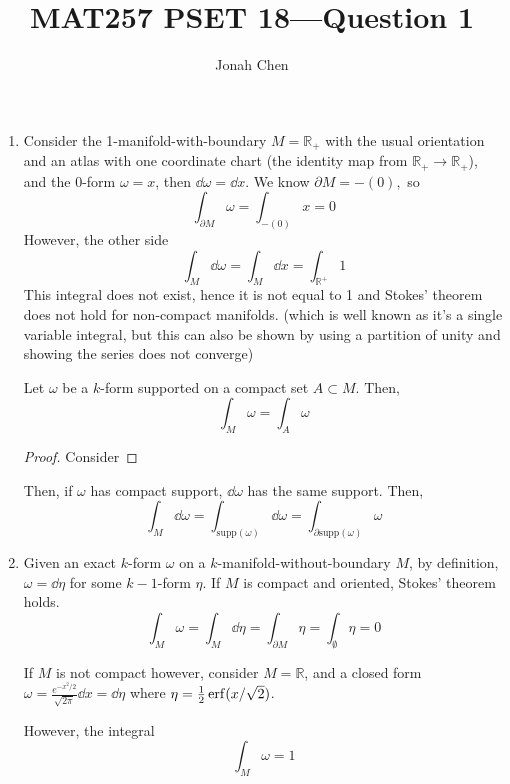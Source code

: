 \documentclass{exam}
\title{MAT257 PSET 18---Question 1}
\author{Jonah Chen}
\date{}
\newcommand{\R}{\mathbb{R}}
\begin{document}
    \sffamily
    \maketitle
    \begin{enumerate}[label=\alph*)]
        \item Consider the 1-manifold-with-boundary $M=\R_+$ with the usual orientation and an atlas with one coordinate chart (the identity map from $\R_+\to\R_+$), and the $0$-form $\omega=x$, then $\dd\omega=\dd x$. We know $\partial M=-(0),$ so
        \begin{equation}
            \int_{\partial M}\omega=\int_{-(0)}x=0
        \end{equation}
        However, the other side
        \begin{equation}
            \int_M\dd\omega=\int_M\dd x=\int_{\R^+}1
        \end{equation}
        This integral does not exist, hence it is not equal to 1 and Stokes' theorem does not hold for non-compact manifolds. (which is well known as it's a single variable integral, but this can also be shown by using a partition of unity and showing the series does not converge)
        \begin{proposition}
            Let $\omega$ be a $k$-form supported on a compact set $A\subset M$. Then,
            \begin{equation}
                \int_{M}\omega=\int_A\omega
            \end{equation}
            \begin{proof}
                Consider
            \end{proof}
        \end{proposition}
        Then, if $\omega$ has compact support, $\dd\omega$ has the same support. Then,
        \begin{equation}
            \int_M\dd\omega=\int_{\mathrm{supp}(\omega)}\dd\omega=\int_{\partial\mathrm{supp}(\omega)}\omega
        \end{equation} 

        \item Given an exact $k$-form $\omega$ on a $k$-manifold-without-boundary $M$, by definition, $\omega=\dd\eta$ for some $k-1$-form $\eta$. If $M$ is compact and oriented, Stokes' theorem holds.
        \begin{equation}
            \int_M\omega=\int_M\dd\eta=\int_{\partial M}\eta=\int_{\emptyset}\eta=0
        \end{equation}

        If $M$ is not compact however, consider $M=\R$, and a closed form $\omega=\frac{e^{-x^2/2}}{\sqrt{2\pi}}\dd x=\dd\eta$ where $\eta=\frac{1}{2}\erf(x/\sqrt2)$.

        However, the integral
        \begin{equation}
            \int_M\omega=1
        \end{equation}
    \end{enumerate}
\end{document}
